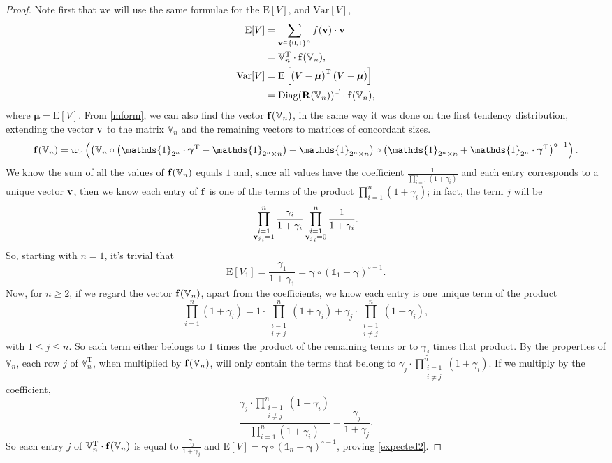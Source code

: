 \documentclass{article}
\newcommand{\0}{\mathbbold{0}}
\newcommand{\1}{\mathds{1}}
\newcommand{\2}{\mathbbold{2}}
\newcommand{\V}{\mathbb{V}}
\newcommand{\T}{^{\operatorname{T}}}
\newcommand{\Diag}[1]{\text{Diag}\!\left(#1\right)}
\begin{document}
\begin{proof}
    Note first that we will use the same formulae for the $\text{E}[V]$, and $\text{Var}[V]$,
    \begin{align*}
        \text{E}[V] &= \sum_{{\bf v} \in \left\{0,1\right\}^n} f({\bf v})\cdot {\bf v} \\
        &= \V_n\T \cdot {\bf f}(\V_n), \\
        \text{Var}[V] &= \text{E}\left[\left(V-{\boldsymbol \mu}\right)\T\left(V-{\boldsymbol \mu}\right)\right] \\
        &= \Diag{{\bf R}(\V_n)}\T \cdot {\bf f}(\V_n),
    \end{align*}
    where ${\boldsymbol \mu} = \text{E}[V]$. From \eqref{mform}, we can also find the vector ${\bf f}(\V_n)$, in the same way it was done on the first tendency distribution, extending the vector ${\bf v}$ to the matrix $\V_n$ and the remaining vectors to matrices of concordant sizes.
    \begin{equation*}
        {\bf f}(\V_n) = \varpi_c\left(\left(\V_n\circ\left(\1_{2^n}\cdot{\boldsymbol \gamma}\T - \1_{2^n\times n}\right) + \1_{2^n\times n}\right)\circ \left(\1_{2^n\times n} + \1_{2^n}\cdot{\boldsymbol \gamma}\T\right)^{\circ -1}\right).
    \end{equation*}
    We know the sum of all the values of ${\bf f}(\V_n)$ equals $1$ and, since all values have the coefficient $\frac{1}{\prod_{i=1}^{n}(1+\gamma_i)}$ and each entry corresponds to a unique vector ${\bf v}$, then we know each entry of ${\bf f}$ is one of the terms of the product $\prod_{i=1}^{n}(1+\gamma_i)$; in fact, the term $j$ will be
    $$ \prod_{\substack{i=1 \\ {{\bf v}_j}_i = 1}}^{n}\frac{\gamma_i}{1+\gamma_i}\prod_{\substack{i=1 \\ {{\bf v}_j}_i = 0}}^{n}\frac{1}{1+\gamma_i}. $$
    So, starting with $n=1$, it's trivial that
    $$ \text{E}[V_1] = \frac{\gamma_1}{1+\gamma_1} = {\boldsymbol \gamma} \circ \left(\1_1 + {\boldsymbol \gamma}\right)^{\circ -1}.$$
    Now, for $n \ge 2$, if we regard the vector ${\bf f}(\V_n)$, apart from the coefficients, we know each entry is one unique term of the product
    $$ \prod_{i=1}^{n}(1+\gamma_i) = 1\cdot\prod_{\substack{i=1 \\ i\ne j}}^{n}(1+\gamma_i) + \gamma_{j}\cdot\prod_{\substack{i=1 \\ i\ne j}}^{n}(1+\gamma_i),$$
    with $1\le j \le n$. So each term either belongs to $1$ times the product of the remaining terms or to $\gamma_j$ times that product.
    By the properties of $\V_n$, each row $j$ of $\V_n\T$, when multiplied by ${\bf f}(\V_n)$, will only contain the terms that belong to $\gamma_{j}\cdot\prod_{\substack{i=1 \\ i\ne j}}^{n}(1+\gamma_i)$. If we multiply by the coefficient,
    $$ \frac{\gamma_{j}\cdot\prod_{\substack{i=1 \\ i\ne j}}^{n}(1+\gamma_i)}{\prod_{i=1}^{n}(1+\gamma_i)} = \frac{\gamma_j}{1+\gamma_j}. $$
    So each entry $j$ of $\V_n\T \cdot {\bf f}(\V_n)$ is equal to $\frac{\gamma_j}{1+\gamma_j}$ and $\text{E}[V] = {\boldsymbol \gamma} \circ \left(\1_n + {\boldsymbol \gamma}\right)^{\circ -1}$, proving \eqref{expected2}.


\end{proof}
\end{document}
